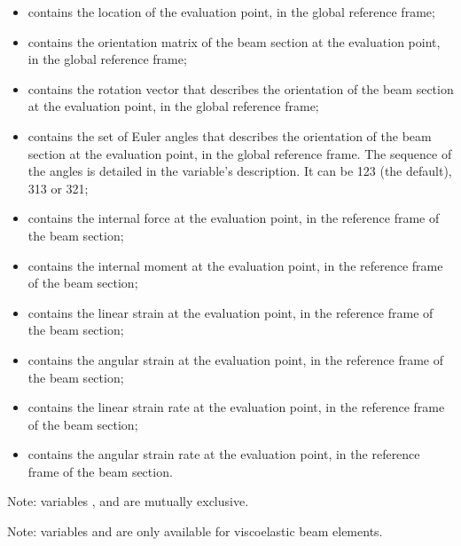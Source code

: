 \begin{itemize}
\item {} contains the location
of the evaluation point, in the global reference frame;

\item {} contains the orientation matrix
of the beam section at the evaluation point, in the global reference frame;

\item {} contains the rotation vector
that describes the orientation of the beam section at the evaluation point,
in the global reference frame;

\item {} contains the set of Euler angles
that describes the orientation of the beam section at the evaluation point,
in the global reference frame.
The sequence of the angles is detailed in the variable's description.
It can be 123 (the default), 313 or 321;

\item {} contains the internal force
at the evaluation point, in the reference frame of the beam section;

\item {} contains the internal moment
at the evaluation point, in the reference frame of the beam section;

\item {} contains the linear strain
at the evaluation point, in the reference frame of the beam section;

\item {} contains the angular strain
at the evaluation point, in the reference frame of the beam section;

\item {} contains the linear strain rate
at the evaluation point, in the reference frame of the beam section;

\item {} contains the angular strain rate
at the evaluation point, in the reference frame of the beam section.
\end{itemize}

Note: variables ,  and  are mutually exclusive.

Note: variables  and 
are only available for viscoelastic beam elements.

